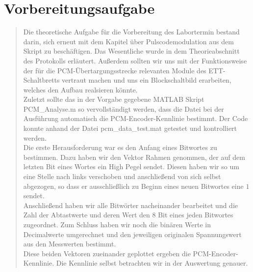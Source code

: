 \section{Vorbereitungsaufgabe}
\begin{quote}
	
	Die theoretische Aufgabe für die Vorbereitung des Labortermin bestand darin,
	sich erneut mit dem Kapitel über Pulscodemodulation aus dem Skript zu
	beschäftigen. Das Wesentliche wurde in dem Theorieabschnitt des Protokolls
	erläutert. Außerdem sollten wir uns mit der Funktionsweise der für
	die PCM-Übertargungsstrecke relevanten Module des ETT-Schaltbretts vertraut
	machen und uns ein Blockschaltbild erarbeiten, welches den Aufbau realsieren
	könnte.\\
	
	Zuletzt sollte das in der Vorgabe gegebene MATLAB Skript PCM\_Analyse.m so
	vervollständigt werden, dass die Datei bei der Ausführung automatisch die
	PCM-Encoder-Kennlinie bestimmt. Der Code konnte anhand der Datei
	pcm\_data\_test.mat getestet und kontrolliert werden. \\
	
	Die erste Herausforderung war es den Anfang eines Bitwortes zu bestimmen. Dazu haben wir den Vektor Rahmen genommen,
	der auf dem letzten Bit eines Wortes ein High Pegel sendet. Diesen haben wir so um eine Stelle nach links
	verschoben und anschließend von sich selbst abgezogen, so dass er ausschließlich zu Beginn eines
	neuen Bitwortes eine $1$ sendet.\\
	Anschließend haben wir alle Bitwörter nacheinander bearbeitet und die Zahl der Abtastwerte und deren Wert den $8$ Bit
	eines jeden Bitwortes zugeordnet.
	Zum Schluss haben wir noch die binären Werte in Decimalwerte umgerechnet und den jeweiligen originalen Spannungswert
	aus den Messwerten bestimmt.\\
	Diese beiden Vektoren zueinander geplottet ergeben die PCM-Encoder-Kennlinie. Die Kennlinie selbst betrachten wir in
	der Auswertung genauer.
	
\end{quote}%


    
